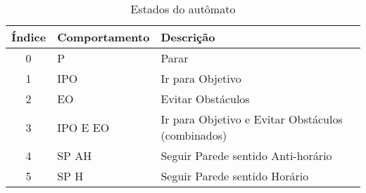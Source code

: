 \begin{table}[ht]
\centering
\caption{Estados do autômato}
\vspace{0.2 cm}
\begin{tabular}{|c|l|l|}
\hline
\textbf{Índice} & \textbf{Comportamento} & \textbf{Descrição}                                         \\ \hline
0      & P             & Parar                                             \\ \hline
1      & IPO           & Ir para Objetivo                                  \\ \hline
2      & EO            & Evitar Obstáculos                                 \\ \hline
3      & IPO E EO    & Ir para Objetivo e Evitar Obstáculos (combinados) \\ \hline
4      & SP AH         & Seguir Parede sentido Anti-horário				   \\ \hline
5      & SP H          & Seguir Parede sentido Horário                     \\ \hline
\end{tabular}
\label{tab:automatoEstados}
\end{table}